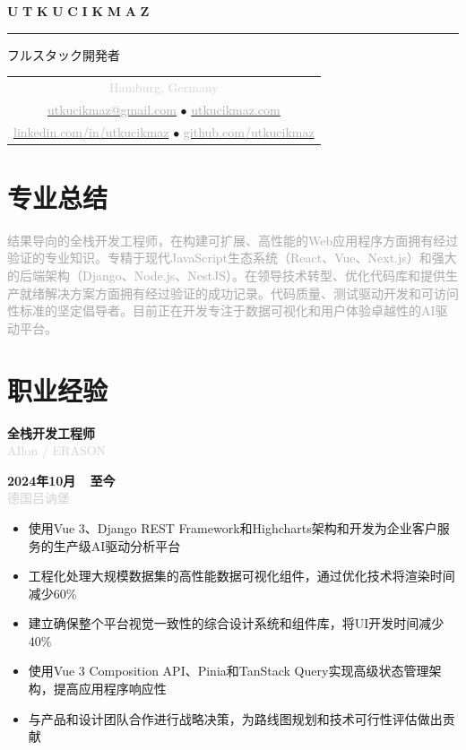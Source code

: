\documentclass[10pt,a4paper]{article}
\newcommand{\Experience}[4]{%
  \vspace{2pt}
  \noindent
  \begin{minipage}[t]{0.70\textwidth}
    {\normalsize\textbf{\color{darkgray}#3}} \\
    \textcolor{lightgray}{\small #1}
  \end{minipage}%
  \hfill
  \begin{minipage}[t]{0.28\textwidth}
    \raggedleft{}
    \textcolor{mediumgray}{\small\textbf{#4}} \\
    \textcolor{lightgray}{\small #2}
  \end{minipage}
  \vspace{1pt}
}
\newcommand{\gradientname}[1]{%
  \textcolor{darkgray!90}{\Huge\bfseries U}%
  \textcolor{darkgray!80}{\Huge\bfseries T}%
  \textcolor{darkgray!70}{\Huge\bfseries K}%
  \textcolor{darkgray!60}{\Huge\bfseries U}%
  \textcolor{mediumgray!90}{\Huge\bfseries\space}%
  \textcolor{mediumgray!80}{\Huge\bfseries C}%
  \textcolor{mediumgray!70}{\Huge\bfseries I}%
  \textcolor{mediumgray!60}{\Huge\bfseries K}%
  \textcolor{mediumgray!50}{\Huge\bfseries M}%
  \textcolor{lightgray!80}{\Huge\bfseries A}%
  \textcolor{lightgray!70}{\Huge\bfseries Z}%
}
\begin{document}
\color{black}
\pagestyle{empty}

\begin{center}
  \vspace{-3pt}
  \gradientname{UTKU CIKMAZ}
  
  \vspace{4pt}
  \textcolor{verylightgray}{\rule{0.35\textwidth}{0.6pt}}
  
  \vspace{4pt}
  {\large\color{mediumgray}フルスタック開発者}
  
  \vspace{5pt}
  \begin{tabular}{c}
    \textcolor{lightgray}{\small Hamburg, Germany} \\[2pt]
    \href{mailto:utkucikmaz@gmail.com}{\textcolor{darkgray}{utkucikmaz@gmail.com}} \quad
    \textcolor{verylightgray}{$\bullet$} \quad
    \href{https://www.utkucikmaz.com}{\textcolor{darkgray}{utkucikmaz.com}} \\[1pt]
    \href{https://linkedin.com/in/utkucikmaz}{\textcolor{darkgray}{linkedin.com/in/utkucikmaz}} \quad
    \textcolor{verylightgray}{$\bullet$} \quad
    \href{https://github.com/utkucikmaz}{\textcolor{darkgray}{github.com/utkucikmaz}}
  \end{tabular}
\end{center}

\vspace{1pt}

\section*{专业总结}
\vspace{0pt}
\textcolor{darkgray}{%
结果导向的全栈开发工程师，在构建可扩展、高性能的Web应用程序方面拥有经过验证的专业知识。专精于现代JavaScript生态系统（React、Vue、Next.js）和强大的后端架构（Django、Node.js、NestJS）。在领导技术转型、优化代码库和提供生产就绪解决方案方面拥有经过验证的成功记录。代码质量、测试驱动开发和可访问性标准的坚定倡导者。目前正在开发专注于数据可视化和用户体验卓越性的AI驱动平台。
}
\vspace{1pt}

\section*{职业经验}

\Experience{AIlon / ERASON}{德国吕讷堡}{全栈开发工程师}{2024年10月~\textendash~至今}
\begin{itemize}
  \item 使用Vue 3、Django REST Framework和Highcharts架构和开发为企业客户服务的生产级AI驱动分析平台
  \item 工程化处理大规模数据集的高性能数据可视化组件，通过优化技术将渲染时间减少60\%
  \item 建立确保整个平台视觉一致性的综合设计系统和组件库，将UI开发时间减少40\%
  \item 使用Vue 3 Composition API、Pinia和TanStack Query实现高级状态管理架构，提高应用程序响应性
  \item 与产品和设计团队合作进行战略决策，为路线图规划和技术可行性评估做出贡献
\end{itemize}
\end{document}
